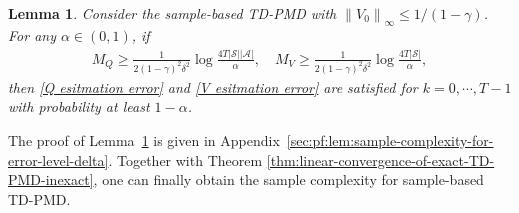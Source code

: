 \documentclass[10pt]{article}
\newcommand{\calA}{\mathcal{A}}
\newcommand{\calS}{\mathcal{S}}
\newcommand{\ls}{\left}
\newcommand{\rs}{\right}
\theoremstyle{plain}
\newtheorem{lemma}[theorem]{Lemma}
\theoremstyle{definition}
\begin{document}
\begin{lemma} Consider the sample-based TD-PMD with  $\ls\| V_0 \rs\|_\infty \leq {1}/{(1-\gamma)}$. For any $\alpha \in (0,1)$, if 
\begin{align*}M_Q \geq \frac{1}{2(1-\gamma)^2 \delta^2} \log \frac{4T|\calS||\calA|}{\alpha}, \quad M_V \geq \frac{1}{2(1-\gamma)^2 \delta^2} \log \frac{4T|\calS|}{\alpha},\end{align*} then \eqref{Q esitmation error} and \eqref{V esitmation error} are satisfied for $k=0,\cdots,T-1$ with  probability at least $1-\alpha$.
\label{lem:sample-complexity-for-error-level-delta}
\end{lemma}

The proof of Lemma~\ref{lem:sample-complexity-for-error-level-delta} is given in Appendix~\ref{sec:pf:lem:sample-complexity-for-error-level-delta}. Together with Theorem \ref{thm:linear-convergence-of-exact-TD-PMD-inexact}, one can finally obtain the sample complexity for sample-based TD-PMD.
\end{document}

